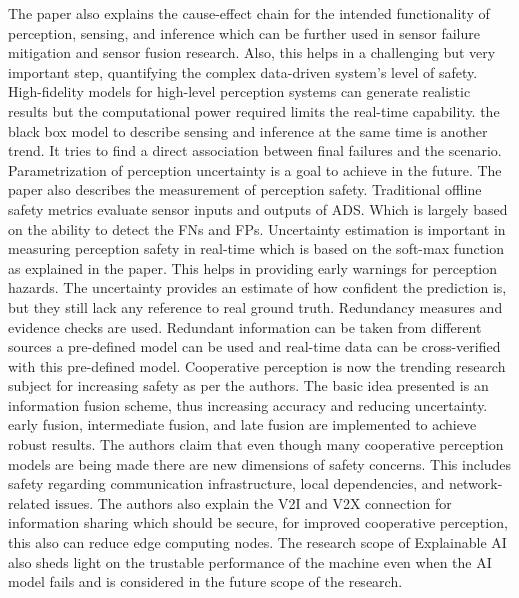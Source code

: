 {The paper also explains the cause-effect chain for the intended functionality of perception, sensing, and inference which can be further used in sensor failure mitigation and sensor fusion research. Also, this helps in a challenging but very important step, quantifying the complex data-driven system's level of safety. High-fidelity models for high-level perception systems can generate realistic results but the computational power required limits the real-time capability. the black box model to describe sensing and inference at the same time is another trend. It tries to find a direct association between final failures and the scenario. Parametrization of perception uncertainty is a goal to achieve in the future. The paper also describes the measurement of perception safety. Traditional offline safety metrics evaluate sensor inputs and outputs of ADS. Which is largely based on the ability to detect the FNs and FPs. Uncertainty estimation is important in measuring perception safety in real-time which is based on the soft-max function as explained in the paper. This helps in providing early warnings for perception hazards. The uncertainty provides an estimate of how confident the prediction is, but they still lack any reference to real ground truth. Redundancy measures and evidence checks are used. Redundant information can be taken from different sources a pre-defined model can be used and real-time data can be cross-verified with this pre-defined model. Cooperative perception is now the trending research subject for increasing safety as per the authors. The basic idea presented is an information fusion scheme, thus increasing accuracy and reducing uncertainty. early fusion, intermediate fusion, and late fusion are implemented to achieve robust results. The authors claim that even though many cooperative perception models are being made there are new dimensions of safety concerns. This includes safety regarding communication infrastructure, local dependencies, and network-related issues. The authors also explain the V2I and V2X connection for information sharing which should be secure, for improved cooperative perception, this also can reduce edge computing nodes.
The research scope of Explainable AI also sheds light on the trustable performance of the machine even when the AI model fails and is considered in the future scope of the research.

}
